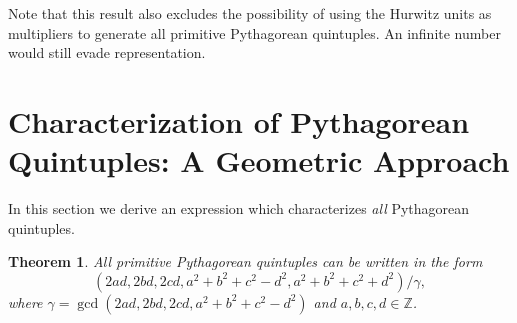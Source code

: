 \documentclass[12pt,table]{article}
\newtheorem{theorem}{Theorem}[section]
\theoremstyle{definition}
\theoremstyle{remark}
\newcommand{\Zzz}{\mathbb Z}
\numberwithin{equation}{section}
\begin{document}
Note that this result also excludes the possibility of 
using the Hurwitz units as multipliers to generate
all primitive Pythagorean quintuples. An infinite
number would still evade representation. 




\section{Characterization of Pythagorean Quintuples:  
A Geometric Approach}

In this section we derive
an expression 
which characterizes {\em all} Pythagorean quintuples.


\begin{theorem}
\label{theorem_like_Hatcher}
All primitive Pythagorean quintuples can
be written in the form
$$(
2ad
,2bd
,2cd
,a^2+b^2+c^2-d^2
,a^2+b^2+c^2+d^2)/\gamma,
$$
where $\gamma = \gcd(2ad,2bd,2cd,a^2 + b^2 + c^2 -d^2)$
and $a, b, c, d \in \Zzz$.
\end{theorem}
\end{document}
